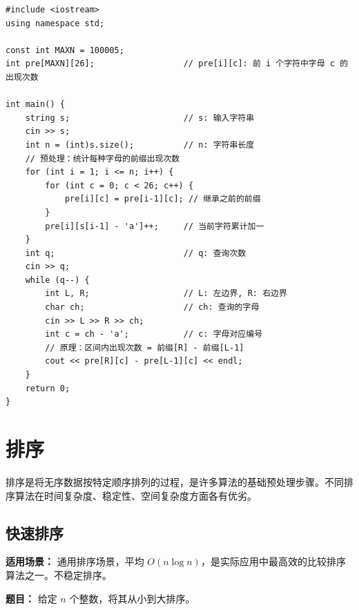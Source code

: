 \documentclass[12pt,a4paper]{ctexart}
\begin{document}
\begin{lstlisting}[caption={前缀和——区间内字母出现次数}]
#include <iostream>
using namespace std;

const int MAXN = 100005;
int pre[MAXN][26];                  // pre[i][c]: 前 i 个字符中字母 c 的出现次数

int main() {
    string s;                       // s: 输入字符串
    cin >> s;
    int n = (int)s.size();          // n: 字符串长度
    // 预处理：统计每种字母的前缀出现次数
    for (int i = 1; i <= n; i++) {
        for (int c = 0; c < 26; c++) {
            pre[i][c] = pre[i-1][c]; // 继承之前的前缀
        }
        pre[i][s[i-1] - 'a']++;     // 当前字符累计加一
    }
    int q;                          // q: 查询次数
    cin >> q;
    while (q--) {
        int L, R;                   // L: 左边界, R: 右边界
        char ch;                    // ch: 查询的字母
        cin >> L >> R >> ch;
        int c = ch - 'a';           // c: 字母对应编号
        // 原理：区间内出现次数 = 前缀[R] - 前缀[L-1]
        cout << pre[R][c] - pre[L-1][c] << endl;
    }
    return 0;
}
\end{lstlisting}

\newpage

\section{排序}
排序是将无序数据按特定顺序排列的过程，是许多算法的基础预处理步骤。不同排序算法在时间复杂度、稳定性、空间复杂度方面各有优劣。

\subsection{快速排序}
\textbf{适用场景：} 通用排序场景，平均 $O(n\log n)$，是实际应用中最高效的比较排序算法之一。不稳定排序。

\textbf{题目：} 给定 $n$ 个整数，将其从小到大排序。
\end{document}
